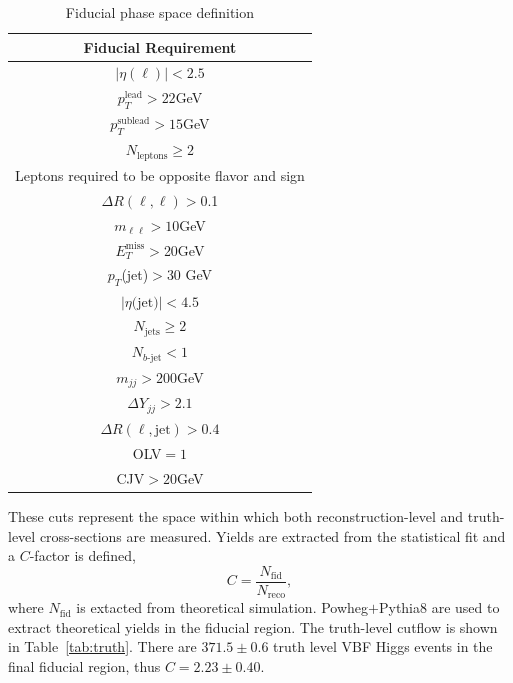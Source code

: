\begin{table}[!ht]
\centering
\begin{tabular}{|c|}
\hline
Fiducial Requirement \\
\hline
$|\eta(\ell)|<2.5$ \\
$p_T^{\text{lead}}>22$GeV \\
$p_T^{\text{sublead}}>15$GeV \\
$N_{\text{leptons}}\geq2$ \\
Leptons required to be opposite flavor and sign \\
$\Delta R(\ell,\ell) >$0.1 \\
$m_{\ell\ell}>10$GeV \\
$E_T^{\text{miss}}>$20GeV \\
$p_T$(jet)$>$30 GeV \\
$|\eta\text{(jet)}|<4.5$ \\ 
$N_{\text{jets}} \geq 2$ \\
$N_{b\text{-jet}} < 1$ \\
$m_{jj} >200$GeV \\
$\Delta Y_{jj}>2.1$ \\
$\Delta R(\ell,\text{jet})>0.4$ \\
OLV$=1$ \\
CJV$>20$GeV \\
\hline
\end{tabular}
\caption{Fiducial phase space definition}
\label{tab:fiducial}
\end{table}
These cuts represent the space within which both reconstruction-level and truth-level cross-sections are measured. Yields are extracted from the statistical fit and a $C$-factor is defined, 
\begin{equation}
C = \frac{N_\text{fid}}{N_{\text{reco}}},
\end{equation}
where $N_\text{fid}$ is extacted from theoretical simulation. Powheg$+$Pythia8 are used to extract theoretical yields in the fiducial region. The truth-level cutflow is shown in Table~\ref{tab:truth}. There are $371.5\pm0.6$ truth level VBF Higgs events in the final fiducial region, thus $C=2.23\pm 0.40$. 

